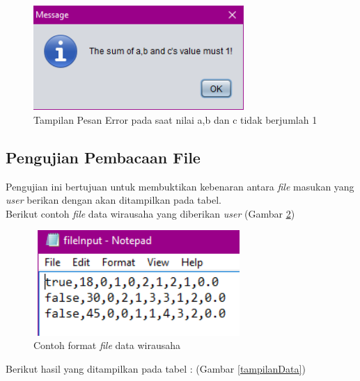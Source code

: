 \begin{enumerate}
	\begin{figure} [H]
	\centering  
	\includegraphics[width=8cm, height=4cm]{pesanError5} 
		\caption[Tampilan Pesan Error pada saat nilai a,b dan c tidak berjumlah 1]{Tampilan Pesan Error pada saat nilai a,b dan c tidak berjumlah 1}
	\label{pesanError5} 
\end{figure}
	
\end{enumerate}

\subsection{Pengujian Pembacaan File}
Pengujian ini bertujuan untuk membuktikan kebenaran antara \textit{file} masukan yang \textit{user} berikan dengan akan ditampilkan pada tabel.\\
Berikut contoh \textit{file} data wirausaha yang diberikan \textit{user} (Gambar \ref{formatFile})

	\begin{figure} [H]
	\centering  
	\includegraphics[width=8cm, height=4cm]{formatFile} 
		\caption[Contoh format \textit{file} data wirausaha]{Contoh format \textit{file} data wirausaha}
	\label{formatFile} 
\end{figure}

Berikut hasil yang ditampilkan pada tabel : (Gambar \ref{tampilanData})

